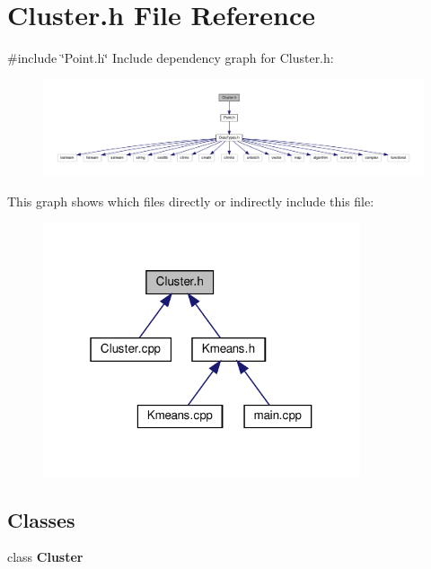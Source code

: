 \section{Cluster.\+h File Reference}
\label{_cluster_8h}
{\ttfamily \#include \char`\"{}Point.\+h\char`\"{}}\newline
Include dependency graph for Cluster.\+h\+:
\nopagebreak
\begin{figure}[H]
\begin{center}
\leavevmode
\includegraphics[width=350pt]{_cluster_8h__incl}
\end{center}
\end{figure}
This graph shows which files directly or indirectly include this file\+:
\nopagebreak
\begin{figure}[H]
\begin{center}
\leavevmode
\includegraphics[width=265pt]{_cluster_8h__dep__incl}
\end{center}
\end{figure}
\subsection*{Classes}
\begin{DoxyCompactItemize}
\item 
class \textbf{ Cluster}
\end{DoxyCompactItemize}
